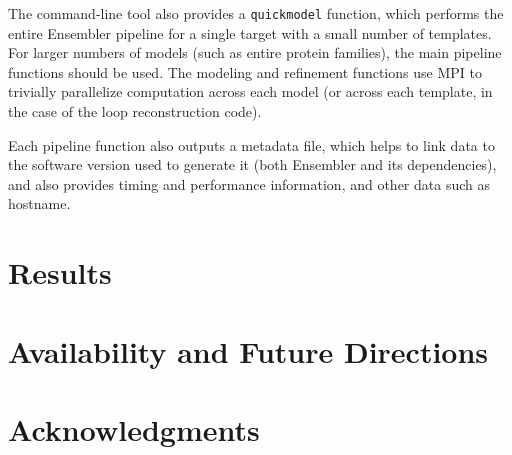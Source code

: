 \documentclass[aps,pre,twocolumn,nofootinbib,superscriptaddress,linenumbers]{revtex4-1}
\begin{document}
The command-line tool also provides a {\tt quickmodel} function, which performs the entire Ensembler pipeline for a single target with a small number of templates.
For larger numbers of models (such as entire protein families), the main pipeline functions should be used.
The modeling and refinement functions use MPI to trivially parallelize computation across each model (or across each template, in the case of the loop reconstruction code).

Each pipeline function also outputs a metadata file, which helps to link data to the software version used to generate it (both Ensembler and its dependencies), and also provides timing and performance information, and other data such as hostname.






\label{section:design}

\section{Results}
\label{section:results}

\section{Availability and Future Directions}
\label{section:availability}

\section{Acknowledgments}
\label{section:acknowledgments}


% 

\end{document}
